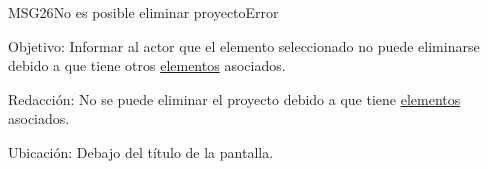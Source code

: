 \begin{mensaje}{MSG26}{No es posible eliminar proyecto}{Error}
	\item [Objetivo:] Informar al actor que el elemento seleccionado no puede eliminarse debido a que tiene otros \hyperlink{tElemento}{elementos} asociados.
	\item[Redacción:] No se puede eliminar el proyecto debido a que tiene \hyperlink{tElemento}{elementos} asociados.
	\item [Ubicación:] Debajo del título de la pantalla.
\end{mensaje}